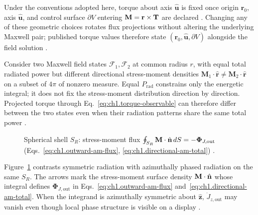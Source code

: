Under the conventions adopted here, torque about axis $\hat{\mathbf{u}}$ is fixed once origin $\mathbf{r}_0$, axis $\hat{\mathbf{u}}$, and control surface $\partial V$ entering $\mathbf{M}=\mathbf{r}\times\mathbf{T}$ are declared \cite{stratton1941}. Changing any of these geometric choices rotates flux projections without altering the underlying Maxwell pair; published torque values therefore state $(\mathbf{r}_0,\hat{\mathbf{u}},\partial V)$ alongside the field solution \cite{beth1936}.

Consider two Maxwell field states \(\mathcal{F}_1,\mathcal{F}_2\) at common radius
\(r\), with equal total radiated power but different directional stress-moment
densities \(\mathbf{M}_1\cdot\hat{\mathbf{r}}\neq
\mathbf{M}_2\cdot\hat{\mathbf{r}}\) on a subset of $4\pi$ of nonzero measure. Equal $P_{\mathrm{rad}}$ constrains only the energetic integral; it does not fix the stress-moment distribution direction by direction. Projected torque through Eq.~\eqref{eq:ch1.torque-observable} can therefore differ between the two states even when their radiation patterns share the same total power \cite{stratton1941}.

\label{prop:ch1.torque-observable-criterion}
\begin{figure}[t]
\centering
\VolIPhysFig{\VolIPhysTorqueBalanceSurface}
\caption{Spherical shell $S_R$: stress-moment flux $\oint_{S_R}\mathbf{M}\cdot\hat{\mathbf{n}}\,dS=-\boldsymbol{\Phi}_{J,\mathrm{out}}$ (Eqs.~\eqref{eq:ch1.outward-am-flux}, \eqref{eq:ch1.directional-am-total}) \cite{beth1936,stratton1941}.}
\label{fig:ch1.wp-torque-balance-surface}
\end{figure}

Figure~\ref{fig:ch1.wp-torque-balance-surface} contrasts symmetric radiation with azimuthally phased radiation on the same $S_R$. The arrows mark the stress-moment surface density $\mathbf{M}\cdot\hat{\mathbf{n}}$ whose integral defines $\boldsymbol{\Phi}_{J,\mathrm{out}}$ in Eqs.~\eqref{eq:ch1.outward-am-flux} and~\eqref{eq:ch1.directional-am-total}. When the integrand is azimuthally symmetric about $\hat{\mathbf{z}}$, $\dot J_{z,\mathrm{out}}$ may vanish even though local phase structure is visible on a display \cite{beth1936,stratton1941}.

